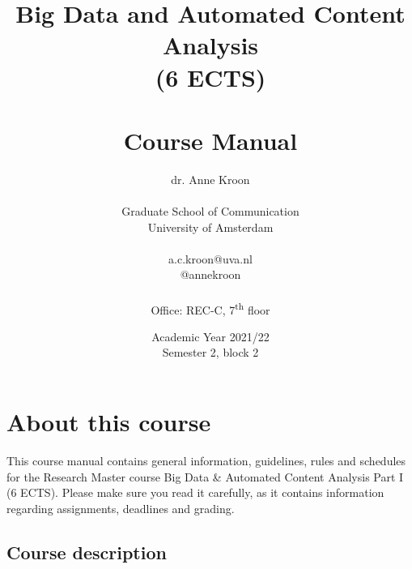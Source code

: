 \documentclass[a4paper,10pt,twocolumn]{report}
\title{Big Data and Automated Content Analysis\\ (6 ECTS)\\~\\Course Manual}
\author{dr. Anne Kroon\\~\\Graduate School of Communication\\University of Amsterdam\\~\\a.c.kroon@uva.nl \\@annekroon \\~\\Office: REC-C, 7\textsuperscript{th} floor}
\date{Academic Year 2021/22\\Semester 2, block  2\\ }
\begin{document}
\maketitle



\chapter{About this course}

This course manual contains general information, guidelines, rules and schedules for the Research Master course Big Data \& Automated Content Analysis Part I (6 ECTS). Please make sure you read it carefully, as it  contains information regarding assignments, deadlines and grading.

\section{Course description}


\end{document}
